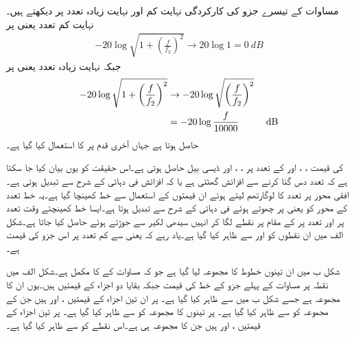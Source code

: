مساوات  کے تیسرے جزو  کی کارکردگی نہایت کم اور نہایت زیادہ تعدد پر دیکھتے ہیں۔نہایت کم تعدد یعنی  پر
\begin{align} \label{مساوات_تعدد_ردعمل_بوڈا_کم_تعدد_تیسرا_حصہ}
-20 \log \sqrt{1+\left(\frac{f}{f_2}\right)^2} \to 20 \log 1 =\SI{0}{dB}
\end{align}
جبکہ نہایت زیادہ تعدد یعنی  پر 
\begin{gather}
\begin{aligned} \label{مساوات_تعدد_ردعمل_بوڈا_زیادہ_تعدد_تیسرا_حصہ}
-20 \log  \sqrt{1+\left(\frac{f}{f_2}\right)^2} &\to -20 \log \sqrt{\left(\frac{f}{f_2}\right)^2} \\
&=-20 \log \frac{f}{10000} \hspace{1 cm} \SI{}{dB}
\end{aligned}
\end{gather}
حاصل ہوتا ہے  جہاں آخری قدم پر  کا استعمال کیا گیا ہے۔

 کی قیمت ، ،  اور  کے تعدد پر ، ،  اور  ڈیسی بیل حاصل ہوتی ہے۔اس حقیقت کو یوں بیان کیا جا سکتا ہے کہ تعدد دس گنا کرنے سے افزائش  گھٹتی ہے یا کہ افزائش   فی دہائی کے شرح سے تبدیل ہوتی ہے۔ افقی محور پر تعدد کا لوگارتھم لیتے ہوئے ان قیمتوں کے استعمال سے خط کھینچا گیا ہے۔یہ خط تعدد کے محور کو  یعنی  پر چھوتے ہوئے  فی دہائی کے شرح سے تبدیل ہوتا ہے۔ایسا خط کھینچتے وقت  تعدد پر  اور  تعدد پر   کے مقام پر نقطے  لگا کر انہیں سیدھی لکیر سے جوڑتے ہوئے حاصل کیا جاتا ہے۔شکل  الف  میں ان نقطوں کو  اور  سے ظاہر کیا گیا ہے۔یاد رہے کہ  یعنی  سے کم تعدد پر اس جزو کی قیمت  ہے۔

شکل  ب میں ان تینوں خطوط کا مجموعہ لیا گیا ہے جو کہ مساوات   کے  کا مکمل  ہے۔شکل  الف میں نقطہ  پر  مساوات  کے پہلے جزو کے خط کی قیمت  جبکہ بقایا دو اجزاء کے قیمتیں  ہیں۔یوں ان کا مجموعہ  ہے جسے شکل  ب میں   سے ظاہر کیا گیا ہے۔ پر ان تین اجزاء کے قیمتیں ،  اور  ہیں جن کے مجموعہ  کو  سے ظاہر کیا گیا ہے۔ پر تینوں کا مجموعہ  کو  سے ظاہر کیا گیا ہے۔ پر تین اجزاء کے قیمتیں ،  اور  ہیں جن کا مجموعہ  ہی ہے۔اس نقطے  کو  سے ظاہر کیا گیا ہے۔

